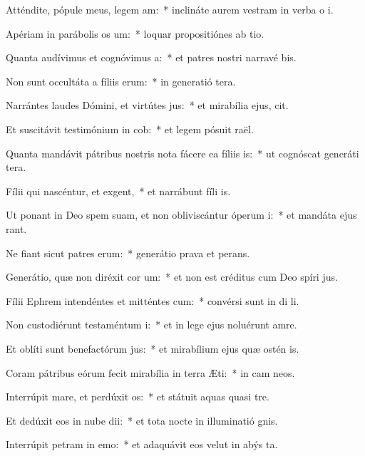 \item Atténdite, pópule meus, legem am:~* inclináte aurem vestram in verba o i.
\item Apériam in parábolis os um:~* loquar propositiónes ab tio.
\item Quanta audívimus et cognóvimus a:~* et patres nostri narravé bis.
\item Non sunt occultáta a fíliis erum:~* in generatió tera.
\item Narrántes laudes Dómini, et virtútes jus:~* et mirabília ejus,  cit.
\item Et suscitávit testimónium in cob:~* et legem pósuit  raël.
\item Quanta mandávit pátribus nostris nota fácere ea fíliis is:~* ut cognóscat generáti tera.
\item Fílii qui nascéntur, et exgent,~* et narrábunt fíli is.
\item Ut ponant in Deo spem suam, et non obliviscántur óperum i:~* et mandáta ejus rant.
\item Ne fiant sicut patres erum:~* generátio prava et perans.
\item Generátio, quæ non diréxit cor um:~* et non est créditus cum Deo spíri jus.
\item Fílii Ephrem intendéntes et mitténtes cum:~* convérsi sunt in di li.
\item Non custodiérunt testaméntum i:~* et in lege ejus noluérunt amre.
\item Et oblíti sunt benefactórum jus:~* et mirabílium ejus quæ ostén is.
\item Coram pátribus eórum fecit mirabília in terra Æti:~* in cam neos.
\item Interrúpit mare, et perdúxit os:~* et státuit aquas quasi  tre.
\item Et dedúxit eos in nube dii:~* et tota nocte in illuminatió gnis.
\item Interrúpit petram in emo:~* et adaquávit eos velut in abýs ta.
